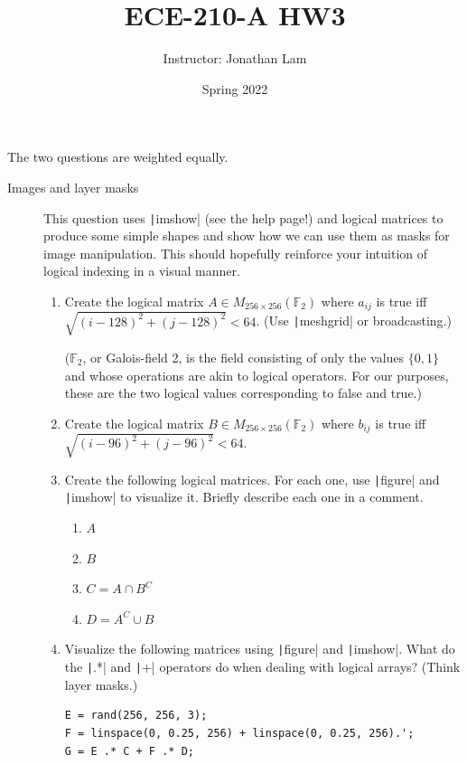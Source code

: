 \documentclass{article}
\title{ECE-210-A HW3}
\author{Instructor: Jonathan Lam}
\date{Spring 2022}
\begin{document}
\maketitle

\noindent The two questions are weighted equally.

\begin{description}
\item[Images and layer masks] This question uses \texttt|imshow| (see the help page!) and logical matrices to produce some simple shapes and show how we can use them as masks for image manipulation. This should hopefully reinforce your intuition of logical indexing in a visual manner.
  
  \begin{enumerate}
  \item Create the logical matrix $A\in M_{256\times 256}(\mathbb{F}_2)$ where $a_{ij}$ is true iff $\sqrt{(i-128)^2+(j-128)^2}<64$. (Use \texttt|meshgrid| or broadcasting.)
    
    ($\mathbb{F}_2$, or Galois-field 2, is the field consisting of only the values $\{0,1\}$ and whose operations are akin to logical operators. For our purposes, these are the two logical values corresponding to false and true.)
    
  \item Create the logical matrix $B\in M_{256\times 256}(\mathbb{F}_2)$ where $b_{ij}$ is true iff $\sqrt{(i-96)^2+(j-96)^2}<64$.
    
  \item Create the following logical matrices. For each one, use \texttt|figure| and \texttt|imshow| to visualize it. Briefly describe each one in a comment.
    \begin{enumerate}
    \item $A$
    \item $B$
    \item $C=A\cap B^C$
    \item $D=A^C\cup B$
    \end{enumerate}
    
  \item Visualize the following matrices using \texttt|figure| and \texttt|imshow|. What do the \texttt|.*| and \texttt|+| operators do when dealing with logical arrays? (Think layer masks.)
\begin{verbatim}
E = rand(256, 256, 3);
F = linspace(0, 0.25, 256) + linspace(0, 0.25, 256).';
G = E .* C + F .* D;
\end{verbatim}
    

\end{enumerate}
\end{description}
\end{document}
